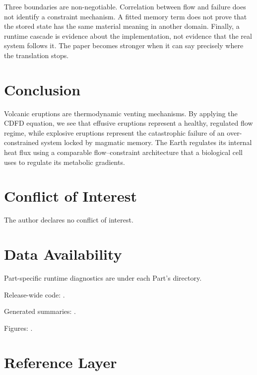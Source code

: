 \documentclass[11pt,a4paper]{article}
\begin{document}
Three boundaries are non-negotiable. Correlation between flow and failure does
not identify a constraint mechanism. A fitted memory term does not prove that
the stored state has the same material meaning in another domain. Finally, a
runtime cascade is evidence about the implementation, not evidence that the
real system follows it. The paper becomes stronger when it can say precisely
where the translation stops.



\section{Conclusion}
Volcanic eruptions are thermodynamic venting mechanisms. By applying the CDFD equation, we see that effusive eruptions represent a healthy, regulated flow regime, while explosive eruptions represent the catastrophic failure of an over-constrained system locked by magmatic memory. The Earth regulates its internal heat flux using a comparable flow--constraint architecture that a biological cell uses to regulate its metabolic gradients.
\section*{Conflict of Interest} The author declares no conflict of interest.
\section*{Data Availability}
Part-specific runtime diagnostics are under each Part's  directory.

Release-wide code: .

Generated summaries: .

Figures: .


\section{Reference Layer}


\end{document}
